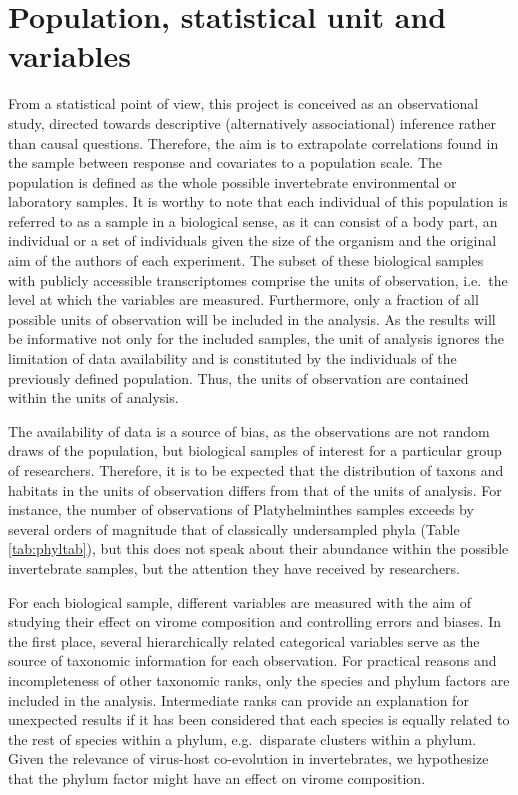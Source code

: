 \documentclass[
  openany]{book}
\begin{document}
\hypertarget{population-statistical-unit-and-variables}{%
\section{Population, statistical unit and variables}\label{population-statistical-unit-and-variables}}

From a statistical point of view, this project is conceived as an observational study, directed towards descriptive (alternatively associational) inference rather than causal questions. Therefore, the aim is to extrapolate correlations found in the sample between response and covariates to a population scale. The population is defined as the whole possible invertebrate environmental or laboratory samples. It is worthy to note that each individual of this population is referred to as a sample in a biological sense, as it can consist of a body part, an individual or a set of individuals given the size of the organism and the original aim of the authors of each experiment. The subset of these biological samples with publicly accessible transcriptomes comprise the units of observation, i.e.~the level at which the variables are measured. Furthermore, only a fraction of all possible units of observation will be included in the analysis. As the results will be informative not only for the included samples, the unit of analysis ignores the limitation of data availability and is constituted by the individuals of the previously defined population. Thus, the units of observation are contained within the units of analysis.

The availability of data is a source of bias, as the observations are not random draws of the population, but biological samples of interest for a particular group of researchers. Therefore, it is to be expected that the distribution of taxons and habitats in the units of observation differs from that of the units of analysis. For instance, the number of observations of Platyhelminthes samples exceeds by several orders of magnitude that of classically undersampled phyla (Table \ref{tab:phyltab}), but this does not speak about their abundance within the possible invertebrate samples, but the attention they have received by researchers.

For each biological sample, different variables are measured with the aim of studying their effect on virome composition and controlling errors and biases. In the first place, several hierarchically related categorical variables serve as the source of taxonomic information for each observation. For practical reasons and incompleteness of other taxonomic ranks, only the species and phylum factors are included in the analysis. Intermediate ranks can provide an explanation for unexpected results if it has been considered that each species is equally related to the rest of species within a phylum, e.g.~disparate clusters within a phylum. Given the relevance of virus-host co-evolution in invertebrates, we hypothesize that the phylum factor might have an effect on virome composition.
\end{document}

